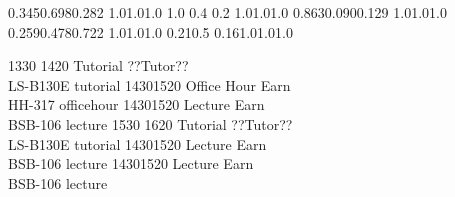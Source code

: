 
\noindent{}

\setslotsize{3.1cm}{0.5cm}
\settextframe{0.8mm}




    {0.345}{0.698}{0.282} {1.0}{1.0}{1.0}
    {1.0} {0.4} {0.2} {1.0}{1.0}{1.0}
 {0.863}{0.090}{0.129} {1.0}{1.0}{1.0}
   {0.259}{0.478}{0.722} {1.0}{1.0}{1.0}
       {0.21}{0.5} {0.16}{1.0}{1.0}{1.0}

\begin{timetable}
   {1330} {1420} {Tutorial}       {??Tutor??\\LS-B130E} {}      {tutorial}
   {1430}{1520} {Office Hour}    {Earn\\HH-317}    {}      {officehour}
   {1430}{1520} {Lecture}        {Earn\\BSB-106}    {}      {lecture}
   {1530} {1620} {Tutorial}       {??Tutor??\\LS-B130E} {}      {tutorial}
   {1430}{1520} {Lecture}        {Earn\\BSB-106}    {}      {lecture}
   {1430}{1520} {Lecture}        {Earn\\BSB-106}    {}      {lecture}
\end{timetable}
